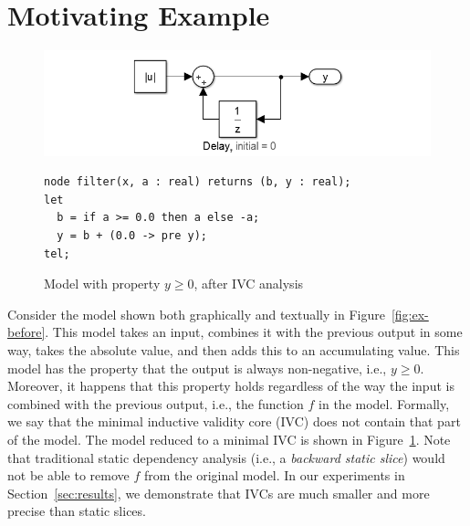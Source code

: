 \section{Motivating Example}
\label{sec:exmpl}

\begin{figure}[t]
\includegraphics[width=\columnwidth]{figs/simulink-ivc.png}
{\smaller
\begin{verbatim}
node filter(x, a : real) returns (b, y : real);
let
  b = if a >= 0.0 then a else -a;
  y = b + (0.0 -> pre y);
tel;
\end{verbatim}
}
\vspace{-0.1in}
\caption{Model with property $y \geq 0$, after IVC analysis}
\label{fig:ex-after}
\end{figure}

Consider the model shown both graphically and textually in
Figure~\ref{fig:ex-before}. This model takes an input, combines it
with the previous output in some way, takes the absolute value, and
then adds this to an accumulating value. This model has the property
that the output is always non-negative, i.e., $y \geq 0$. Moreover, it
happens that this property holds regardless of the way the input is
combined with the previous output, i.e., the function $f$ in the
model. Formally, we say that the minimal inductive validity core (IVC) does
not contain that part of the model. The model reduced to a minimal IVC
is shown in Figure~\ref{fig:ex-after}. Note that traditional static
dependency analysis (i.e., a {\em backward static slice}) would not be able to
remove $f$ from the original model.  In our experiments in Section~\ref{sec:results},
we demonstrate that IVCs are much smaller and more precise than static slices.


